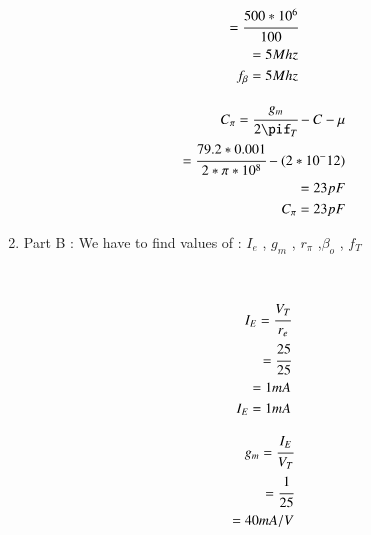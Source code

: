 \begin{enumerate}[label=\thesubsection.\arabic*.,ref=\thesubsection.\theenumi]
\begin{align}
               = \cfrac{500 * 10^6}{100}\\
               
               = 5 Mhz\\
              
              
        
     f_{\beta} = 5 Mhz
        

\end{align}
     
\begin{align}
     
     C_{\pi} = \cfrac{g_{m}}{2\pif_{T}}- C-{\mu}\\
             
    
              
             = \cfrac{79.2 * 0.001}{2*\pi*{10^8}}- (2*{10^-12})\\
              
           
              
              = 23 pF\\
              
    C_{\pi} = 23 pF
        
\end{align}


\item
Part B : We have to find values of :
 $I_{e}$ , $g_{m}$ , $r_{\pi}$ ,$\beta_{o}$ , $f_{T}$
 
\\
 
 \solution

\begin{align}

    I_{E} = \cfrac{V_{T}}{r_{e}}\\
          
          = \cfrac{25}{25}\\
          
          = 1 mA\\
        
    
    I_{E} = 1 mA
        
\end{align}

\begin{align}
    
    g_{m} = \cfrac{I_{E}}{V_{T}}\\
          
          = \cfrac{1}{25}\\
          
          = 40 mA/V\\
        

\end{align}
\end{enumerate}
